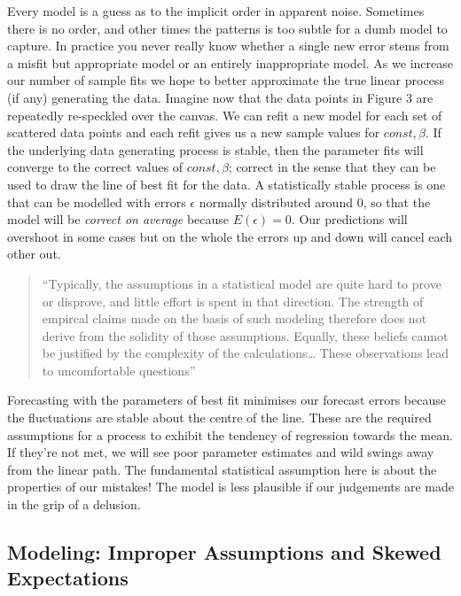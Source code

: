 \documentclass[]{tufte-book}
\theoremstyle{definition}
\theoremstyle{definition}
\theoremstyle{definition}
\theoremstyle{remark}
\begin{document}
Every model is a guess as to the implicit order in apparent noise. Sometimes there is no order, and other times the patterns is too subtle for a dumb model to capture. In practice you never really know whether a single new error stems from a misfit but appropriate model or an entirely inappropriate model. As we increase our number of sample fits we hope to better approximate the true linear process (if any) generating the data. Imagine now that the data points in Figure 3 are repeatedly re-speckled over the canvas. We can refit a new model for each set of scattered data points and each refit gives us a new sample values for \(const, \beta\). If the underlying data generating process is stable, then the parameter fits will converge to the correct values of \(const, \beta\); correct in the sense that they can be used to draw the line of best fit for the data. A statistically stable process is one that can be modelled with errors \(\epsilon\) normally distributed around \(0\), so that the model will be \textit{ correct on average} because \(E(\epsilon) = 0\). Our predictions will overshoot in some cases but on the whole the errors up and down will cancel each other out.

\begin{quote}
``Typically, the assumptions in a statistical model are quite hard to prove or disprove, and little effort is spent in that direction. The strength of empircal claims made on the basis of such modeling therefore does not derive from the solidity of those assumptions. Equally, these beliefs cannot be justified by the complexity of the calculations\ldots{} These observations lead to uncomfortable questions'' \citep{freedman_2009}
\end{quote}

Forecasting with the parameters of best fit minimises our forecast errors because the fluctuations are stable about the centre of the line. These are the required assumptions for a process to exhibit the tendency of regression towards the mean. If they're not met, we will see poor parameter estimates and wild swings away from the linear path. The fundamental statistical assumption here is about the properties of our mistakes! The model is less plausible if our judgements are made in the grip of a delusion.

\hypertarget{modeling-improper-assumptions-and-skewed-expectations}{%
\subsection{Modeling: Improper Assumptions and Skewed Expectations}\label{modeling-improper-assumptions-and-skewed-expectations}}
\end{document}
